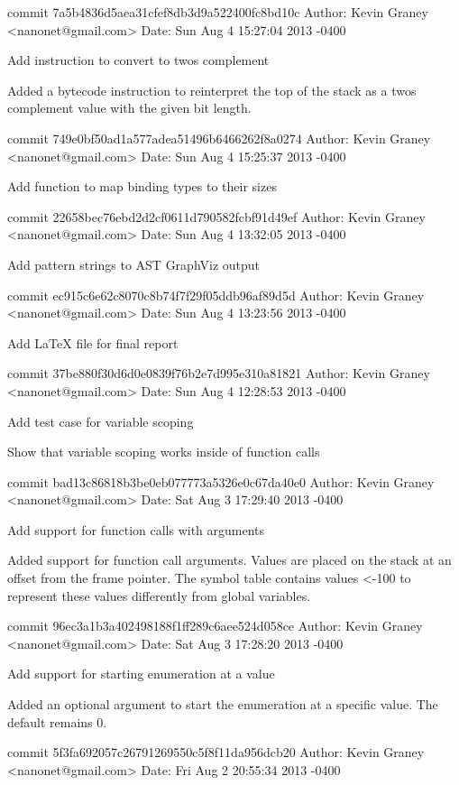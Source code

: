 commit 7a5b4836d5aea31cfef8db3d9a522400fc8bd10c
Author: Kevin Graney <nanonet@gmail.com>
Date:   Sun Aug 4 15:27:04 2013 -0400

    Add instruction to convert to twos complement
    
    Added a bytecode instruction to reinterpret the top of the stack
    as a twos complement value with the given bit length.

commit 749e0bf50ad1a577adea51496b6466262f8a0274
Author: Kevin Graney <nanonet@gmail.com>
Date:   Sun Aug 4 15:25:37 2013 -0400

    Add function to map binding types to their sizes

commit 22658bec76ebd2d2cf0611d790582fcbf91d49ef
Author: Kevin Graney <nanonet@gmail.com>
Date:   Sun Aug 4 13:32:05 2013 -0400

    Add pattern strings to AST GraphViz output

commit ec915c6e62c8070c8b74f7f29f05ddb96af89d5d
Author: Kevin Graney <nanonet@gmail.com>
Date:   Sun Aug 4 13:23:56 2013 -0400

    Add LaTeX file for final report

commit 37be880f30d6d0e0839f76b2e7d995e310a81821
Author: Kevin Graney <nanonet@gmail.com>
Date:   Sun Aug 4 12:28:53 2013 -0400

    Add test case for variable scoping
    
    Show that variable scoping works inside of function calls

commit bad13c86818b3be0eb077773a5326e0c67da40e0
Author: Kevin Graney <nanonet@gmail.com>
Date:   Sat Aug 3 17:29:40 2013 -0400

    Add support for function calls with arguments
    
    Added support for function call arguments.  Values are placed on
    the stack at an offset from the frame pointer.  The symbol table
    contains values <-100 to represent these values differently from
    global variables.

commit 96ec3a1b3a402498188f1ff289c6aee524d058ce
Author: Kevin Graney <nanonet@gmail.com>
Date:   Sat Aug 3 17:28:20 2013 -0400

    Add support for starting enumeration at a value
    
    Added an optional argument to start the enumeration at a specific
    value.  The default remains 0.

commit 5f3fa692057c26791269550c5f8f11da956dcb20
Author: Kevin Graney <nanonet@gmail.com>
Date:   Fri Aug 2 20:55:34 2013 -0400


